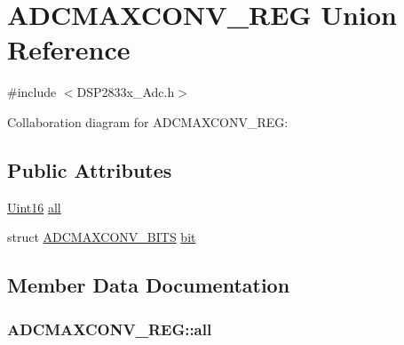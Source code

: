 \hypertarget{union_a_d_c_m_a_x_c_o_n_v___r_e_g}{}\section{A\+D\+C\+M\+A\+X\+C\+O\+N\+V\+\_\+\+R\+E\+G Union Reference}
\label{union_a_d_c_m_a_x_c_o_n_v___r_e_g}


{\ttfamily \#include $<$D\+S\+P2833x\+\_\+\+Adc.\+h$>$}



Collaboration diagram for A\+D\+C\+M\+A\+X\+C\+O\+N\+V\+\_\+\+R\+E\+G\+:
\subsection*{Public Attributes}
\begin{DoxyCompactItemize}
\item 
\hyperlink{_d_s_p2833x___device_8h_a59a9f6be4562c327cbfb4f7e8e18f08b}{Uint16} \hyperlink{union_a_d_c_m_a_x_c_o_n_v___r_e_g_ab0ac22ae25efb7b59a431b3e19f12935}{all}
\item 
struct \hyperlink{struct_a_d_c_m_a_x_c_o_n_v___b_i_t_s}{A\+D\+C\+M\+A\+X\+C\+O\+N\+V\+\_\+\+B\+I\+T\+S} \hyperlink{union_a_d_c_m_a_x_c_o_n_v___r_e_g_ad4708982d234215d010c18a0123bb0c1}{bit}
\end{DoxyCompactItemize}


\subsection{Member Data Documentation}
\hypertarget{union_a_d_c_m_a_x_c_o_n_v___r_e_g_ab0ac22ae25efb7b59a431b3e19f12935}{}
\subsubsection[{all}]{ A\+D\+C\+M\+A\+X\+C\+O\+N\+V\+\_\+\+R\+E\+G\+::all}\label{union_a_d_c_m_a_x_c_o_n_v___r_e_g_ab0ac22ae25efb7b59a431b3e19f12935}
\hypertarget{union_a_d_c_m_a_x_c_o_n_v___r_e_g_ad4708982d234215d010c18a0123bb0c1}{}
